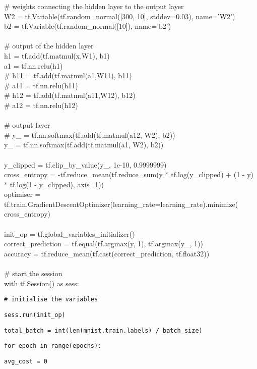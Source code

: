 \documentclass[letterpaper]{article}
\begin{document}
\begin{appendices}
{\# weights connecting the hidden layer to the output layer\\
W2 = tf.Variable(tf.random\_normal([300, 10], stddev=0.03), name='W2')\\
b2 = tf.Variable(tf.random\_normal([10]), name='b2')\\\\
\# output of the hidden layer\\
h1 = tf.add(tf.matmul(x,W1), b1)\\
a1 = tf.nn.relu(h1)\\
\# h11 = tf.add(tf.matmul(a1,W11), b11)\\
\# a11 = tf.nn.relu(h11)\\
\# h12 = tf.add(tf.matmul(a11,W12), b12)\\
\# a12 = tf.nn.relu(h12)\\\\
\# output layer\\
\# y\_ = tf.nn.softmax(tf.add(tf.matmul(a12, W2), b2))\\
y\_ = tf.nn.softmax(tf.add(tf.matmul(a1, W2), b2))\\\\
y\_clipped = tf.clip\_by\_value(y\_, 1e-10, 0.9999999)\\
cross\_entropy = -tf.reduce\_mean(tf.reduce\_sum(y * tf.log(y\_clipped)
+ (1 - y) * tf.log(1 - y\_clipped), axis=1))\\
optimiser = tf.train.GradientDescentOptimizer(learning\_rate=learning\_rate).minimize(\\cross\_entropy)\\\\
init\_op = tf.global\_variables\_initializer()\\
correct\_prediction = tf.equal(tf.argmax(y, 1), tf.argmax(y\_, 1))\\
accuracy = tf.reduce\_mean(tf.cast(correct\_prediction, tf.float32))\\\\
\# start the session\\
with tf.Session() as sess:}

\texttt{\# initialise the variables}

\texttt{sess.run(init\_op)}

\texttt{total\_batch = int(len(mnist.train.labels) / batch\_size)}

\texttt{for epoch in range(epochs):}

\texttt{\hspace{1em}avg\_cost = 0}


\end{appendices}
\end{document}
